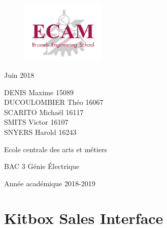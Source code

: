 \documentclass[12pt,oneside]{report}
\begin{document}
	\begin{titlepage}
		\begin{center}
			\vspace*{\fill}
			
 			\begin{figure}[h]
       	 		\includegraphics[width=4cm, center]{Figures/LogoEcam.png}	
       	 	\end{figure}
 			\vspace{\baselineskip}
 			
       		\vspace{0.5cm}


       		\normalsize{Juin 2018} 
			
       		\vspace*{\fill}
       		
       		\large{DENIS Maxime 15089 \\
                DUCOULOMBIER Théo 16067\\
                SCARITO Michaël 16117\\
                SMITS Victor 16107\\
                SNYERS Harold 16243}
            \vspace{\baselineskip}
            
            \large{Ecole centrale des arts et métiers}
            \vspace{\baselineskip}
            
       		\small{BAC 3 Génie Électrique}
       		\vspace{\baselineskip}
       		
       		\normalsize{Année académique 2018-2019}
   		\end{center}
	\end{titlepage}

\tableofcontents

\newpage
\chapter{Kitbox Sales Interface}
\vspace{\baselineskip}
\vspace{\baselineskip}
\end{document}
